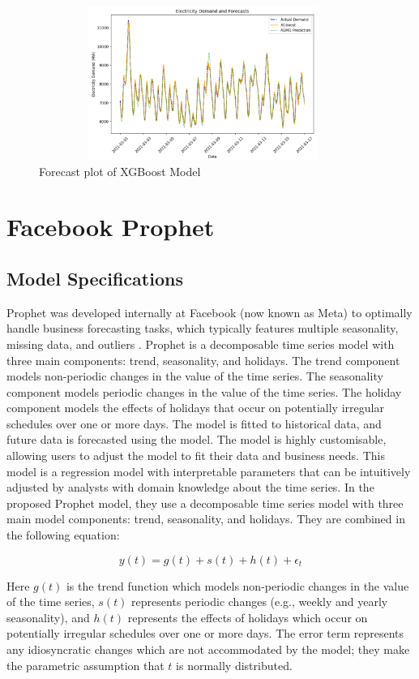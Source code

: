 \documentclass[mstat,12pt]{unswthesis}
\begin{document}
\begin{figure}[H]
\centering
\includegraphics[width=0.95\textwidth, height=5cm]{forecastplot.png}
\caption{Forecast plot of XGBoost Model}\label{forecastplot}
\end{figure}

\section{Facebook Prophet}\label{facebook-prophet}

\subsection{Model Specifications}\label{model-specifications-1}

Prophet was developed internally at Facebook (now known as Meta) to
optimally handle business forecasting tasks, which typically features
multiple seasonality, missing data, and outliers
\cite{taylor2017facebook}. Prophet is a decomposable time series model
with three main components: trend, seasonality, and holidays. The trend
component models non-periodic changes in the value of the time series.
The seasonality component models periodic changes in the value of the
time series. The holiday component models the effects of holidays that
occur on potentially irregular schedules over one or more days. The
model is fitted to historical data, and future data is forecasted using
the model. The model is highly customisable, allowing users to adjust
the model to fit their data and business needs. This model is a
regression model with interpretable parameters that can be intuitively
adjusted by analysts with domain knowledge about the time series. In the
proposed Prophet model, they use a decomposable time series model with
three main model components: trend, seasonality, and holidays. They are
combined in the following equation:

\[
y(t) = g(t) + s(t) + h(t) + \epsilon_t
\]

Here \(g(t)\) is the trend function which models non-periodic changes in
the value of the time series, \(s(t)\) represents periodic changes
(e.g., weekly and yearly seasonality), and \(h(t)\) represents the
effects of holidays which occur on potentially irregular schedules over
one or more days. The error term represents any idiosyncratic changes
which are not accommodated by the model; they make the parametric
assumption that \(t\) is normally distributed.
\end{document}
